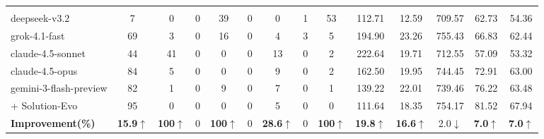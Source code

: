 \documentclass{article}
\theoremstyle{plain}
\theoremstyle{definition}
\theoremstyle{remark}
\begin{document}
\begin{figure}[t]
\begin{minipage}[t]{\textwidth}
\begin{tabular}{l cccccccc ccc c >{\columncolor{cyan!15}}c}
\midrule
\rowcolor{gray!15} \multicolumn{14}{c}{\textit{\textbf{Go}}} \\
deepseek-v3.2 & \cellcolor{cyan!15}7 & 0 & 0 & 39 & 0 & 0 & 1 & 53 & \cellcolor{cyan!15}112.71 & 12.59 & 709.57 & \cellcolor{cyan!15}62.73 & 54.36 \\
grok-4.1-fast & \cellcolor{cyan!15}69 & 3 & 0 & 16 & 0 & 4 & 3 & 5 & \cellcolor{cyan!15}194.90 & 23.26 & 755.43 & \cellcolor{cyan!15}66.83 & 62.44 \\
claude-4.5-sonnet & \cellcolor{cyan!15}44 & 41 & 0 & 0 & 0 & 13 & 0 & 2 & \cellcolor{cyan!15}222.64 & 19.71 & 712.55 & \cellcolor{cyan!15}57.09 & 53.32 \\
claude-4.5-opus & \cellcolor{cyan!15}84 & 5 & 0 & 0 & 0 & 9 & 0 & 2 & \cellcolor{cyan!15}162.50 & 19.95 & 744.45 & \cellcolor{cyan!15}72.91 & 63.00 \\
gemini-3-flash-preview & \cellcolor{cyan!15}82 & 1 & 0 & 9 & 0 & 7 & 0 & 1 & \cellcolor{cyan!15}139.22 & 22.01 & 739.46 & \cellcolor{cyan!15}76.22 & 63.48 \\
\quad + Solution-Evo & \cellcolor{cyan!15}95 & 0 & 0 & 0 & 0 & 5 & 0 & 0 & \cellcolor{cyan!15}111.64 & 18.35 & 754.17 & \cellcolor{cyan!15}81.52 & 67.94 \\
\cmidrule{2-14}
\textbf{Improvement(\%)} & \cellcolor{cyan!15}\textbf{15.9$\uparrow$} & \textbf{100$\uparrow$} & 0 & \textbf{100$\uparrow$} & 0 & \textbf{28.6$\uparrow$} & 0 & \textbf{100$\uparrow$} & \cellcolor{cyan!15}\textbf{19.8$\uparrow$} & \textbf{16.6$\uparrow$} & 2.0$\downarrow$ & \cellcolor{cyan!15}\textbf{7.0$\uparrow$} & \textbf{7.0$\uparrow$} \\


\end{tabular}
\end{minipage}
\end{figure}
\end{document}
